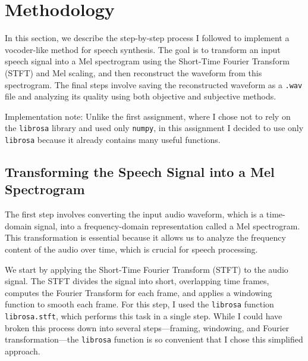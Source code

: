 \documentclass[12pt]{article}
\begin{document}



\section{Methodology}

In this section, we describe the step-by-step process I followed to implement a vocoder-like method for speech synthesis. The goal is to transform an input speech signal into a Mel spectrogram using the Short-Time Fourier Transform (STFT) and Mel scaling, and then reconstruct the waveform from this spectrogram. The final steps involve saving the reconstructed waveform as a \texttt{.wav} file and analyzing its quality using both objective and subjective methods.

Implementation note: Unlike the first assignment, where I chose not to rely on the \texttt{librosa} library and used only \texttt{numpy}, in this assignment I decided to use only \texttt{librosa} because it already contains many useful functions.

\subsection{Transforming the Speech Signal into a Mel Spectrogram}

The first step involves converting the input audio waveform, which is a time-domain signal, into a frequency-domain representation called a Mel spectrogram. This transformation is essential because it allows us to analyze the frequency content of the audio over time, which is crucial for speech processing.

We start by applying the Short-Time Fourier Transform (STFT) to the audio signal. The STFT divides the signal into short, overlapping time frames, computes the Fourier Transform for each frame, and applies a windowing function to smooth each frame. For this step, I used the \texttt{librosa} function \texttt{librosa.stft}, which performs this task in a single step. While I could have broken this process down into several steps—framing, windowing, and Fourier transformation—the \texttt{librosa} function is so convenient that I chose this simplified approach.
\end{document}
